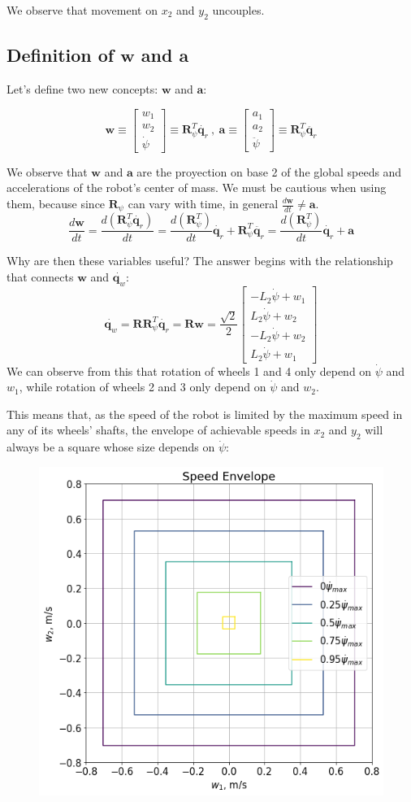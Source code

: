\documentclass[12pt]{article}
\renewcommand{\vec}[1]{\bm{#1}}
\newcommand{\R}{\mathbb R}
\newcommand{\w}{\dot\varphi}
\def\R{\vec R}
\def\q{\vec q}
\begin{document}
We observe that movement on $x_2$ and $y_2$ uncouples.

\subsection*{Definition of $\vec{w}$ and $\vec{a}$ }

Let's define two new concepts: $\vec{w}$ and $\vec{a}$:

$$ \vec{w} \equiv \left[\begin{matrix} w_1\\w_2\\\dot{\psi}\end{matrix}\right] \equiv \R_{\psi}^T \dot{\q_r}\ ,\ \vec{a} \equiv \left[\begin{matrix} a_1\\a_2\\\ddot{\psi}\end{matrix}\right] \equiv \R_{\psi}^T \ddot{\q_r}$$

We observe that  $\vec{w}$ and $\vec{a}$ are the proyection on base 2 of the global speeds and accelerations of the robot's center of mass. We must be cautious when using them, because since $\R_{\psi}$ can vary with time, in general $\frac{d\vec{w}}{dt}\neq\vec{a}$.
$$\frac{d\vec{w}}{dt} = \frac{d(\R_{\psi}^T \dot{\q_r})}{dt} =  \frac{d(\R_{\psi}^T)}{dt}\dot{\q_r} + \R_{\psi}^T \ddot{\q_r}=  \frac{d(\R_{\psi}^T)}{dt}\dot{\q_r} + \vec{a}$$

Why are then these variables useful? The answer begins with the relationship that connects  $\vec{w}$ and $\dot{\q_w}$:
$$\dot{\q_w} = \R \R_{\psi}^T \dot{\q_r} = \R \vec{w} = \frac{\sqrt{2}}{2}\left[\begin{matrix}- L_{2} \dot{\psi} + w_1\\L_{2} \dot{\psi} + w_2\\- L_{2} \dot{\psi} + w_2\\L_{2} \dot{\psi} + w_1\end{matrix}\right]$$
We can observe from this that rotation of wheels 1 and 4 only depend on $\dot{\psi}$ and $w_1$, while rotation of wheels 2 and 3 only depend on $\dot{\psi}$ and $w_2$.

This means that, as the speed of the robot is limited by the maximum speed in any of its wheels' shafts, the envelope of achievable speeds in $x_2$ and $y_2$ will always be a square whose size depends on $\dot{\psi}$:
\begin{figure}[h]
	\centering
	\includegraphics[width=.5\linewidth]{speed_envelope}
	\label{fig:speed_envelope}
\end{figure}
\end{document}
